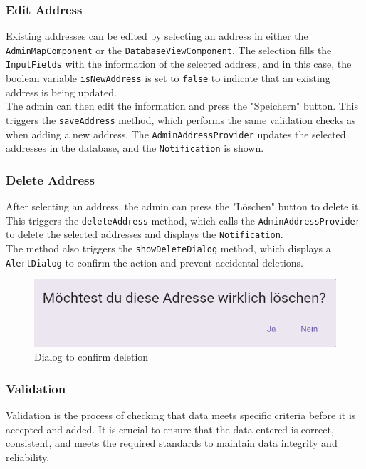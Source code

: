 \subsubsection{Edit Address}
\sloppy %
Existing addresses can be edited by selecting an address in either the \texttt{AdminMapComponent} or the \texttt{DatabaseViewComponent}.
The selection fills the \texttt{InputFields} with the information of the selected address, and in this case, the boolean variable \texttt{isNewAddress} is set to \texttt{false} to indicate that an existing address is being updated.\\

\sloppy
The admin can then edit the information and press the "Speichern" button. This triggers the \texttt{saveAddress} method, which performs the same validation checks as when adding a new address. The \texttt{AdminAddressProvider} updates the selected addresses in the database, and the \texttt{Notification} is shown.

\subsubsection{Delete Address}
After selecting an address, the admin can press the "Löschen" button to delete it. This triggers the \texttt{deleteAddress} method, which calls the \texttt{AdminAddressProvider} to delete the selected addresses and displays the \texttt{Notification}.\\

The method also triggers the \texttt{showDeleteDialog} method, which displays a \texttt{AlertDialog} to confirm the action and prevent accidental deletions.

\begin{figure}[H]
    \centering
    \includegraphics[width=0.6\linewidth]{images/AdminPanel/DeleteDialog.png}
    \caption{Dialog to confirm deletion}
\end{figure}
\newpage

\subsubsection{Validation}
\label{fig:Validation}
    Validation is the process of checking that data meets specific criteria before it is accepted and added. It is crucial to ensure that the data entered is correct, consistent, and meets the required standards to maintain data integrity and reliability. \autocite{ContributorstoWikimediaprojects2025Feb}
